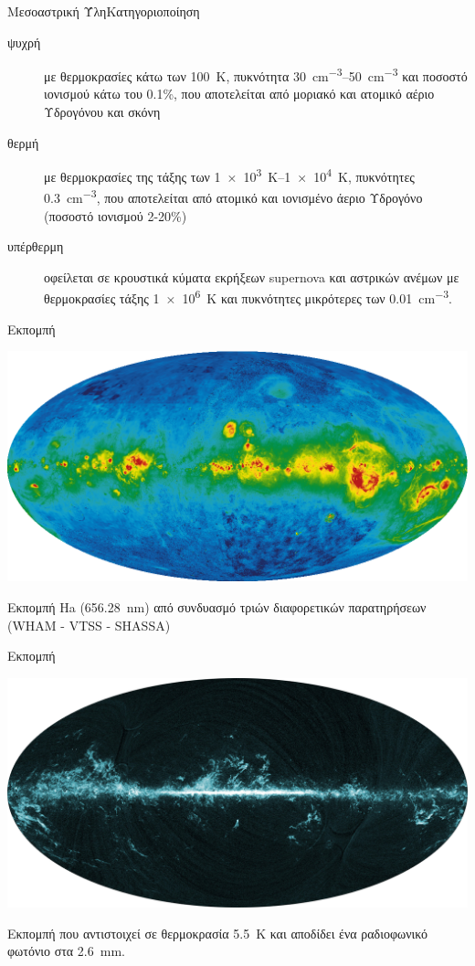\documentclass{beamer}
\begin{document}
\begin{frame}{Μεσοαστρική Ύλη}{Κατηγοριοποίηση}
	\begin{description}
		\item[ψυχρή]{με θερμοκρασίες κάτω των \SI{100}{\kelvin},
			πυκνότητα \SIrange{30}{50}{cm^{-3}} και ποσοστό ιονισμού κάτω του 0.1\%, που αποτελείται από μοριακό και ατομικό αέριο Υδρογόνου και σκόνη}
		\item[θερμή]{με θερμοκρασίες της τάξης των \SIrange{1e3}{1e4}{K}, πυκνότητες \SI{0.3}{cm^{-3}}, που αποτελείται από ατομικό και ιονισμένο άεριο Υδρογόνο (ποσοστό ιονισμού 2-20\%)}
		\item[υπέρθερμη]{οφείλεται σε κρουστικά κύματα εκρήξεων supernova και αστρικών ανέμων με θερμοκρασίες τάξης \SI{1e6}{K} και πυκνότητες μικρότερες των \SI{0.01}{cm^{-3}}.}
	\end{description}
\end{frame}

\begin{frame}{Εκπομπή }
\begin{center}
	\includegraphics[width=1\linewidth]{../Document/Images/Ha}
\end{center}
	Εκπομπή Ha (\SI{656.28}{nm}) από συνδυασμό τριών διαφορετικών παρατηρήσεων (WHAM - VTSS - SHASSA)
\end{frame}

\begin{frame}{Εκπομπή }
\begin{center}
	\includegraphics[width=1\linewidth]{../Document/Images/CO}
\end{center}
 Εκπομπή  που αντιστοιχεί σε θερμοκρασία \SI{5.5}{K} και αποδίδει ένα ραδιοφωνικό φωτόνιο στα \SI{2.6}{mm}.
\end{frame}
\end{document}
